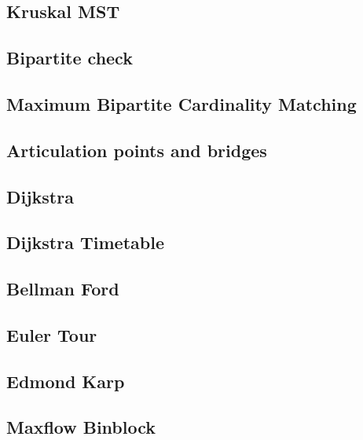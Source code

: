 \documentclass[a4paper,landscape,8pt]{article}
\begin{document}
\begin{multicols}{2}
\subsection{Kruskal MST}


\subsection{Bipartite check}


\subsection{Maximum Bipartite Cardinality Matching}


\subsection{Articulation points and bridges}


\subsection{Dijkstra}


\subsection{Dijkstra Timetable}


\subsection{Bellman Ford}


\subsection{Euler Tour}


\subsection{Edmond Karp}


\subsection{Maxflow Binblock}



\end{multicols}
\end{document}
